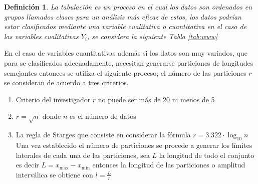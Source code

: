 \documentclass[a4paper]{report}
\newtheorem{defn}[thm]{Definición}
\begin{document}
\begin{defn}
	La tabulación es un proceso en el cual los datos son ordenados en grupos llamados clases para un análisis más eficaz de estos, los datos podrían estar clasificados mediante una variable cualitativa o cuantitativa en el caso de las variables cualitativas $Y_i$, se considera la siguiente Tabla \ref{tab:www}
\end{defn}


En el caso de variables cuantitativas además si los datos son muy variados, que para se clasificados adecuadamente, necesitan generarse particiones de longitudes semejantes entonces se utiliza el siguiente proceso; el número de las particiones $r$ se consideran de acuerdo a tres criterios.
\begin{enumerate}
	\item Criterio del investigador $r$ no puede ser más de 20 ni menos de 5
	\item $r=\sqrt{n}$ donde $n$ es el número de datos
	\item La regla de Starges que consiste en considerar la fórmula $r=3.322\cdot\log_{10} n$ Una vez establecido el número de particiones se procede a generar los límites laterales de cada una de las particiones, sea $L$ la longitud de todo el conjunto es decir $L=x_{\text{max}}-x_{\text{min}}$ entonces la longitud de las particiones o amplitud interválica se obtiene con $l=\frac{L}{r}$
\end{enumerate}
\end{document}
